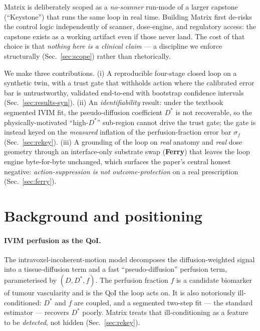 \documentclass[12pt]{iopart}
\newcommand{\Dstar}{D^{*}}
\newcommand{\sigf}{\sigma_{f}}
\newcommand{\fq}{f}          %
\begin{document}
Matrix is deliberately scoped as a \emph{no-scanner} run-mode of a larger capstone
(``Keystone'') that runs the same loop in real time. Building Matrix first de-risks the
control logic independently of scanner, dose-engine, and regulatory access: the capstone
exists as a working artifact even if those never land. The cost of that choice is that
\emph{nothing here is a clinical claim} --- a discipline we enforce structurally
(Sec.~\ref{sec:scope}) rather than rhetorically.

We make three contributions. (i) A reproducible four-stage closed loop on a synthetic
twin, with a trust gate that withholds action where the calibrated error bar is
untrustworthy, validated end-to-end with bootstrap confidence intervals
(Sec.~\ref{sec:results-syn}). (ii) An \emph{identifiability} result: under the textbook
segmented IVIM fit, the pseudo-diffusion coefficient $\Dstar$ is not recoverable, so the
physically-motivated ``high-$\Dstar$'' sub-region cannot drive the trust gate; the gate
is instead keyed on the \emph{measured} inflation of the perfusion-fraction error bar
$\sigf$ (Sec.~\ref{sec:rekey}). (iii) A grounding of the loop on \emph{real} anatomy and
\emph{real} dose geometry through an interface-only substrate swap (\textbf{Ferry}) that
leaves the loop engine byte-for-byte unchanged, which surfaces the paper's central honest
negative: \emph{action-suppression is not outcome-protection} on a real prescription
(Sec.~\ref{sec:ferry}).

\section{Background and positioning}\label{sec:bg}
\paragraph{IVIM perfusion as the QoI.} The intravoxel-incoherent-motion model
decomposes the diffusion-weighted signal into a tissue-diffusion term and a fast
``pseudo-diffusion'' perfusion term, parameterised by $(D,\Dstar,\fq)$. The perfusion
fraction $\fq$ is a candidate biomarker of tumour vascularity and is the QoI the loop
acts on. It is also notoriously ill-conditioned: $\Dstar$ and $\fq$ are coupled, and a
segmented two-step fit --- the standard estimator --- recovers $\Dstar$ poorly. Matrix
treats that ill-conditioning as a feature to be \emph{detected}, not hidden
(Sec.~\ref{sec:rekey}).
\end{document}
